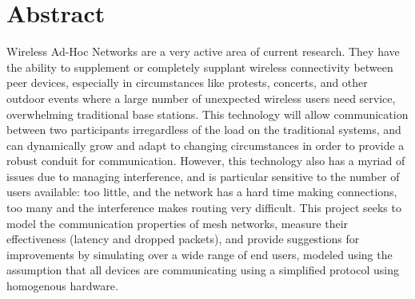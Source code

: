 \section{Abstract}
Wireless Ad-Hoc Networks are a very active area of current research.
They have the ability to supplement or completely supplant wireless connectivity between peer devices,
especially in circumstances like protests, concerts, and other outdoor events where a large number of
unexpected wireless users need service, overwhelming traditional base stations.
This technology will allow communication between two participants irregardless of the load on the
traditional systems, and can dynamically grow and adapt to changing circumstances in order to provide
a robust conduit for communication.
However, this technology also has a myriad of issues due to managing interference, and is particular
sensitive to the number of users available: too little, and the network has a hard time making
connections, too many and the interference makes routing very difficult.
This project seeks to model the communication properties of mesh networks, 
measure their effectiveness (latency and dropped packets), 
and provide suggestions for improvements by simulating over a wide range of end users, 
modeled using the assumption that all devices are communicating using a simplified protocol
using homogenous hardware.
